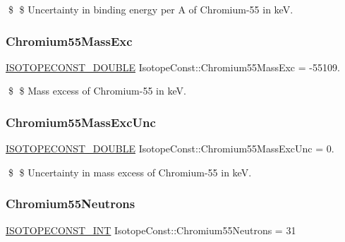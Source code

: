 \$ \$ Uncertainty in binding energy per A of Chromium-\/55 in keV. \mbox{\label{group___isotope_const-_chromium-_cr55_gaf86755645af37a34d2b3c0112b8941a7}} 
\subsubsection{\texorpdfstring{Chromium55\+Mass\+Exc}{Chromium55MassExc}}
{\footnotesize\ttfamily \mbox{\hyperlink{group___isotope_const-_macros_ga8f45a7272ce02c0b4c65c44636ed719a}{I\+S\+O\+T\+O\+P\+E\+C\+O\+N\+S\+T\+\_\+\+D\+O\+U\+B\+LE}} Isotope\+Const\+::\+Chromium55\+Mass\+Exc = -\/55109.}

\$ \$ Mass excess of Chromium-\/55 in keV. \mbox{\label{group___isotope_const-_chromium-_cr55_gac7437a09b25e92fdd2e3306d14e025a6}} 
\subsubsection{\texorpdfstring{Chromium55\+Mass\+Exc\+Unc}{Chromium55MassExcUnc}}
{\footnotesize\ttfamily \mbox{\hyperlink{group___isotope_const-_macros_ga8f45a7272ce02c0b4c65c44636ed719a}{I\+S\+O\+T\+O\+P\+E\+C\+O\+N\+S\+T\+\_\+\+D\+O\+U\+B\+LE}} Isotope\+Const\+::\+Chromium55\+Mass\+Exc\+Unc = 0.}

\$ \$ Uncertainty in mass excess of Chromium-\/55 in keV. \mbox{\label{group___isotope_const-_chromium-_cr55_ga699ef87146e2295c283ab978b2e8f9f7}} 
\subsubsection{\texorpdfstring{Chromium55\+Neutrons}{Chromium55Neutrons}}
{\footnotesize\ttfamily \mbox{\hyperlink{group___isotope_const-_macros_ga5f18360b3e99483a35c32d789e62621c}{I\+S\+O\+T\+O\+P\+E\+C\+O\+N\+S\+T\+\_\+\+I\+NT}} Isotope\+Const\+::\+Chromium55\+Neutrons = 31}

